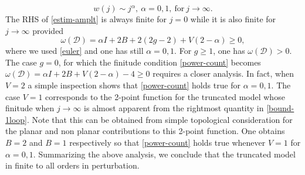 \documentclass[11pt]{book}
\theoremstyle{break}
\begin{document}
\begin{equation}
w(j)\sim j^\alpha,\ \alpha=0,1,\ {\text{for}}\  j\to\infty.\label{alpha-values}
\end{equation}
The RHS of \eqref{estim-amplt} is always finite for $j=0$ while it is also finite for $j\to\infty$ provided%
\begin{equation}
\omega(\mathcal{D})=\alpha I+2B+2(2g-2)+V(2-\alpha)\ge0,\label{power-count}
\end{equation}
where we used \eqref{euler} and one has still $\alpha=0,1$. For $g\ge1$, one has $\omega(\mathcal{D})>0$. The case $g=0$, for which the finitude condition \eqref{power-count} becomes $\omega(\mathcal{D})=\alpha I+2B+V(2-\alpha)-4\ge0$ requires a closer analysis. In fact, when $V=2$ a simple inspection shows that \eqref{power-count} holds true for $\alpha=0,1$. The case $V=1$ corresponds to the 2-point function for the truncated model whose finitude when $j\to\infty$ is almost apparent from the rightmost quantity in \eqref{bound-1loop}. Note that this can be obtained from simple topological consideration for the planar and non planar contributions to this 2-point function. One obtains $B=2$ and $B=1$ respectively so that \eqref{power-count} holds true whenever $V=1$ for $\alpha=0,1$. Summarizing the above analysis, we conclude that the truncated model in finite to all orders in perturbation.\par
\end{document}
